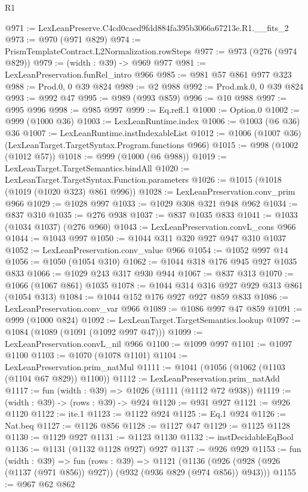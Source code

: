 \begin{lexlean}{R1}
\begin{coremodule}
@971 := LexLeanPreserve.C4cd0caed9fdd884fa395b3066a67213e.R1.__fits_2
@973 := @970 (@971 @829)
@974 := PrismTemplateContract.L2Normalization.rowSteps
@977 := @973 (@276 (@974 @829))
@979 := (width : @39) -> @969 @977
@981 := LexLeanPreservation.funRel_intro @966
@985 := @981 @57 @861 @977 @323
@988 := Prod.{0, 0} @39 @824
@989 := @2 @988
@992 := Prod.mk.{0, 0} @39 @824
@993 := @992 @47
@995 := @989 (@993 @859)
@996 := @10 @988
@997 := @995 @996
@998 := @985 @997
@999 := Eq.refl.{1}
@1000 := Option.{0}
@1002 := @999 (@1000 @36)
@1003 := LexLeanRuntime.index
@1006 := @1003 (@6 @36) @36
@1007 := LexLeanRuntime.instIndexableList
@1012 := @1006 (@1007 @36) (LexLeanTarget.TargetSyntax.Program.functions @966)
@1015 := @998 (@1002 (@1012 @57))
@1018 := @999 (@1000 (@6 @988))
@1019 := LexLeanTarget.TargetSemantics.bindAll
@1020 := LexLeanTarget.TargetSyntax.Function.parameters
@1026 := @1015 (@1018 (@1019 (@1020 @323) @861 @996))
@1028 := LexLeanPreservation.conv_prim @966
@1029 := @1028 @997
@1033 := @1029 @308 @321 @948 @962
@1034 := @837 @310
@1035 := @276 @938
@1037 := @837 @1035 @833
@1041 := @1033 (@1034 @1037) (@276 @960)
@1043 := LexLeanPreservation.convL_cons @966
@1044 := @1043 @997
@1050 := @1044 @311 @320 @927 @947 @310 @1037
@1052 := LexLeanPreservation.conv_value @966
@1054 := @1052 @997 @14
@1056 := @1050 (@1054 @310)
@1062 := @1044 @318 @176 @945 @927 @1035 @833
@1066 := @1029 @243 @317 @930 @944
@1067 := @837 @313
@1070 := @1066 (@1067 @861) @1035
@1078 := @1044 @314 @316 @927 @929 @313 @861 (@1054 @313)
@1084 := @1044 @152 @176 @927 @927 @859 @833
@1086 := LexLeanPreservation.conv_var @966
@1089 := @1086 @997 @47 @859
@1091 := @999 (@1000 @824)
@1092 := LexLeanTarget.TargetSemantics.lookup
@1097 := @1084 (@1089 (@1091 (@1092 @997 @47)))
@1099 := LexLeanPreservation.convL_nil @966
@1100 := @1099 @997
@1101 := @1097 @1100
@1103 := @1070 (@1078 @1101)
@1104 := LexLeanPreservation.prim_natMul
@1111 := @1041 (@1056 (@1062 (@1103 (@1104 @67 @829)) @1100))
@1112 := LexLeanPreservation.prim_natAdd
@1117 := fun (width : @39) => @1026 (@1111 (@1112 @72 @938))
@1119 := (width : @39) -> (rows : @39) -> @924
@1120 := @931 @927
@1121 := @926 @1120
@1122 := ite.{1}
@1123 := @1122 @924
@1125 := Eq.{1} @924
@1126 := Nat.beq
@1127 := @1126 @856
@1128 := @1127 @47
@1129 := @1125 @1128
@1130 := @1129 @927
@1131 := @1123 @1130
@1132 := instDecidableEqBool
@1136 := @1131 (@1132 @1128 @927) @927
@1137 := @926 @929
@1153 := fun (width : @39) =>
  fun (rows : @39) =>
  @1121 (@1136 (@926 (@928 (@926 (@1137 (@971 @856)) @927)) (@932 (@936 @829 (@974 @856)) @943)))
@1155 := @967 @62 @862

\end{coremodule}
\end{lexlean}
